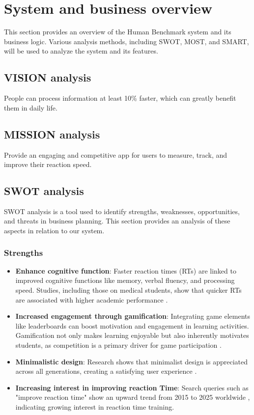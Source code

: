 \documentclass[]{VUMIFTemplateClass}
\begin{document}
\section{System and business overview}
\label{sec:system_overview}

This section provides an overview of the Human Benchmark system and its business logic. Various analysis methods, including SWOT, MOST, and SMART, will be used to analyze the system and its features.

\subsection{VISION analysis}
People can process information at least 10\% faster, which can greatly benefit them in daily life.

\subsection{MISSION analysis}
Provide an engaging and competitive app for users to measure, track, and improve their reaction speed. 

\subsection{SWOT analysis}
SWOT analysis is a tool used to identify strengths, weaknesses, opportunities, and threats in business planning. This section provides an analysis of these aspects in relation to our system.

\subsubsection{Strengths}
\begin{itemize}
    \item \textbf{Enhance cognitive function}: Faster reaction times (RTs) are linked to improved cognitive functions like memory, verbal fluency, and processing speed. Studies, including those on medical students, show that quicker RTs are associated with higher academic performance \cite{CognitiveFunction}.
    \item \textbf{Increased engagement through gamification}: Integrating game elements like leaderboards can boost motivation and engagement in learning activities. Gamification not only makes learning enjoyable but also inherently motivates students, as competition is a primary driver for game participation \cite{GameplayEngagement}.
    \item \textbf{Minimalistic design}: Research shows that minimalist design is appreciated across all generations, creating a satisfying user experience \cite{MinimalDesign}.
    \item \textbf{Increasing interest in improving reaction Time}: Search queries such as "improve reaction time" show an upward trend from 2015 to 2025 worldwide \cite{googletrends}, indicating growing interest in reaction time training. 
\end{itemize}
\end{document}
